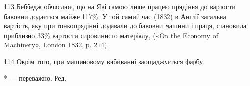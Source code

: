 113    Беббедж обчислює, що на Яві самою лише працею прядіння до
вартости бавовни додається майже 117\%. У той самий час (1832) в Англії
загальна вартість, яку при тонкопрядінні додавали до бавовни машини
і праця, становила приблизно 33\% вартости сировинного матеріялу,
(«On the Economy of Machinery», London 1832, p. 214).

114    Окрім того, при машиновому вибиванні заощаджується фарбу.

* — переважно. Ред.
